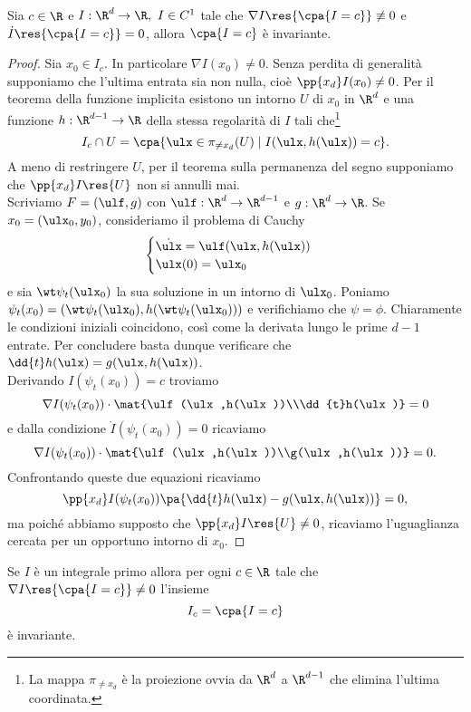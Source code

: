 \begin{proposition}\label{CostruzioneInsiemiInvariantiCurveDiLivello}
Sia $c\in\R$ e $I:\R^d\to \R,\ I\in C^1$ tale che $\nabla I\res{\cpa{I=c}}\not\equiv 0$ e $\dot I\res{\cpa{I=c}}=0$, allora $\cpa{I=c}$ \`e invariante.
\end{proposition}
\begin{proof}
Sia $x_0\in I_c$. In particolare $\nabla I(x_0)\neq 0$. Senza perdita di generalit\`a supponiamo che l'ultima entrata sia non nulla, cio\`e $\pp{x_d}I(x_0)\neq 0$. Per il teorema della funzione implicita esistono un intorno $U$ di $x_0$ in $\R^d$ e una funzione $h:\R^{d-1}\to \R$ della stessa regolarit\`a di $I$ tali che\footnote{La mappa $\pi_{\neq x_d}$ \`e la proiezione ovvia da $\R^d$ a $\R^{d-1}$ che elimina l'ultima coordinata.}
\[I_c\cap U=\cpa{\ulx\in \pi_{\neq x_d}(U)\mid I(\ulx, h(\ulx))=c}.\]
A meno di restringere $U$, per il teorema sulla permanenza del segno supponiamo che $\pp{x_d}I\res{U}$ non si annulli mai.\\
Scriviamo $F=(\ulf,g)$ con $\ulf:\R^d\to \R^{d-1}$ e $g:\R^d\to\R$. Se $x_0=(\ulx_0,y_0)$, consideriamo il problema di Cauchy
\[\begin{cases}
\dot \ulx=\ulf(\ulx,h(\ulx))\\
\ulx(0)=\ulx_0
\end{cases}\]
e sia $\wt \psi_t(\ulx_0)$ la sua soluzione in un intorno di $\ulx_0$. Poniamo $\psi_t(x_0)=(\wt \psi_t(\ulx_0),h(\wt \psi_t(\ulx_0)))$ e verifichiamo che $\psi=\phi$. Chiaramente le condizioni iniziali coincidono, cos\`i come la derivata lungo le prime $d-1$ entrate. Per concludere basta dunque verificare che $\dd{t}h(\ulx)=g(\ulx,h(\ulx))$.\\
Derivando $I(\psi_t(x_0))=c$ troviamo 
\[\nabla I(\psi_t(x_0))\cdot \mat{\ulf(\ulx,h(\ulx))\\\dd{t}h(\ulx)}=0\]
e dalla condizione $\dot I(\psi_t(x_0))=0$ ricaviamo
\[\nabla I(\psi_t(x_0))\cdot \mat{\ulf(\ulx,h(\ulx))\\g(\ulx,h(\ulx))}=0.\]
Confrontando queste due equazioni ricaviamo
\[\pp{x_d}I(\psi_t(x_0))\pa{\dd{t}h(\ulx)-g(\ulx,h(\ulx))}=0,\]
ma poich\'e abbiamo supposto che $\pp{x_d}I\res{U}\neq 0$, ricaviamo l'uguaglianza cercata per un opportuno intorno di $x_0$.
\end{proof}

\begin{corollary}\label{InvarianzaInsiemiLivelloIntegraliPrimi}
Se $I$ \`e un integrale primo allora per ogni $c\in\R$ tale che $\nabla I\res{\cpa{I=c}}\neq0$ l'insieme
\[I_c=\cpa{I=c}\]
\`e invariante.
\end{corollary}


